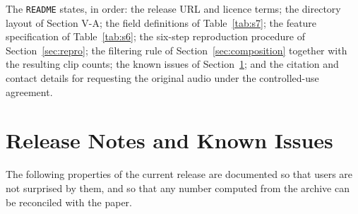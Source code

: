 \documentclass[conference]{IEEEtran}
\begin{document}
\noindent The \texttt{README} states, in order: the release URL and licence terms; the
directory layout of Section V-A; the field definitions of Table~\ref{tab:s7}; the feature
specification of Table~\ref{tab:s6}; the six-step reproduction procedure of
Section~\ref{sec:repro}; the filtering rule of Section~\ref{sec:composition} together
with the resulting clip counts; the known issues of Section~\ref{sec:issues}; and the
citation and contact details for requesting the original audio under the controlled-use
agreement.

\section{Release Notes and Known Issues}
\label{sec:issues}
The following properties of the current release are documented so that users are not
surprised by them, and so that any number computed from the archive can be reconciled
with the paper.
\end{document}
